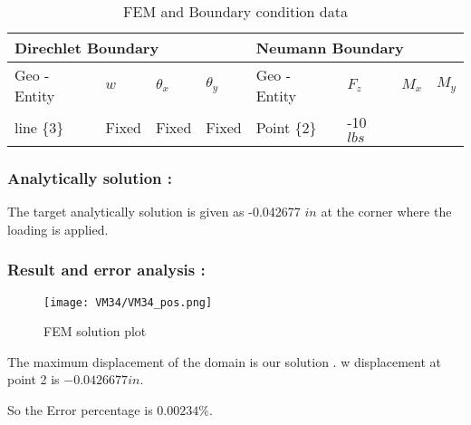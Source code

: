 \documentclass[VM.tex]{subfiles}
\begin{document}
\begin{table}[h!]
\renewcommand{\arraystretch}{1.5}
\centering
\caption{FEM and Boundary condition data}
\label{my-label}
\begin{tabular}{|l|lll|l|lll|}
\hline
 \multicolumn{4}{l|}{\cellcolor[HTML]{C0C0C0}Direchlet Boundary} & \multicolumn{4}{l|}{\cellcolor[HTML]{C0C0C0}Neumann Boundary} \\ \hline \hline
  Geo - Entity      & $w$          & $\theta _ x$     & $\theta _ y $    & Geo -  Entity         & $F_z$        & $M_x$        & $M_y$        \\ \hline line \{3\}                   & Fixed      & Fixed         & Fixed        & Point \{2\}                    & -10 $lbs$        &           &           \\ \hline
\end{tabular}
\end{table}
\subsubsection*{Analytically solution : }
The target analytically solution is given as -0.042677 $in$ at the corner where the loading is applied.
\newpage
\subsubsection*{Result and error analysis : }

\begin{figure}[h!]
\centering
{}%
  \texttt{[image: VM34/VM34\_pos.png]}
  \caption{FEM solution plot}\label{fig:awesome_image3}
\endminipage
\end{figure}
The maximum displacement of the domain is our solution . w displacement at point 2 is $ -0.0426677 in $.


So the Error percentage is $ 0.00234 \% $. 
\end{document}
